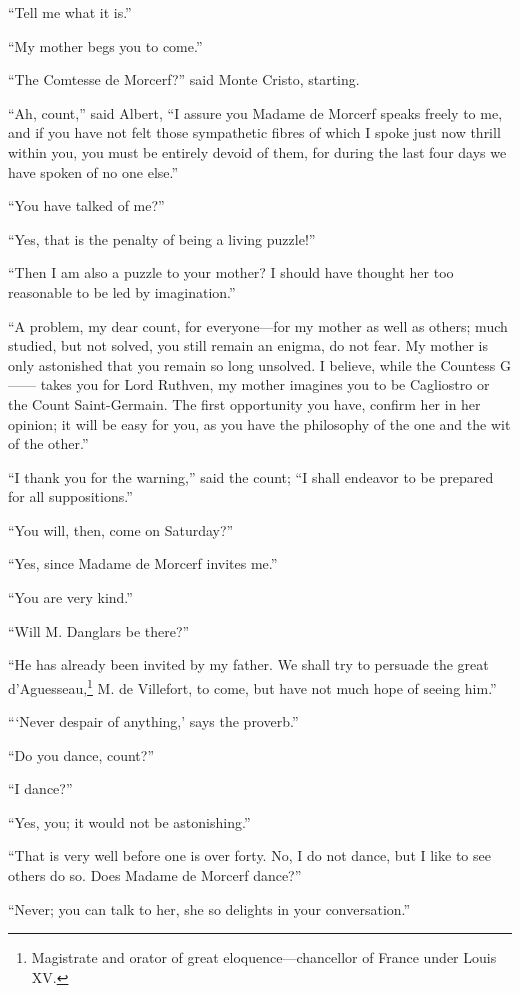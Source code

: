 “Tell me what it is.”

“My mother begs you to come.”

“The Comtesse de Morcerf?” said Monte Cristo, starting.

“Ah, count,” said Albert, “I assure you Madame de Morcerf speaks freely
to me, and if you have not felt those sympathetic fibres of which I
spoke just now thrill within you, you must be entirely devoid of them,
for during the last four days we have spoken of no one else.”

“You have talked of me?”

“Yes, that is the penalty of being a living puzzle!”

“Then I am also a puzzle to your mother? I should have thought her too
reasonable to be led by imagination.”

“A problem, my dear count, for everyone—for my mother as well as
others; much studied, but not solved, you still remain an enigma, do
not fear. My mother is only astonished that you remain so long
unsolved. I believe, while the Countess G—— takes you for Lord Ruthven,
my mother imagines you to be Cagliostro or the Count Saint-Germain. The
first opportunity you have, confirm her in her opinion; it will be easy
for you, as you have the philosophy of the one and the wit of the
other.”

“I thank you for the warning,” said the count; “I shall endeavor to be
prepared for all suppositions.”

“You will, then, come on Saturday?”

“Yes, since Madame de Morcerf invites me.”

“You are very kind.”

“Will M. Danglars be there?”

“He has already been invited by my father. We shall try to persuade the
great d’Aguesseau,\footnote[11]{Magistrate and orator of great
eloquence—chancellor of France under Louis XV.} M. de Villefort, to come,
but have not much hope of seeing him.”

“‘Never despair of anything,’ says the proverb.”

“Do you dance, count?”

“I dance?”

“Yes, you; it would not be astonishing.”

“That is very well before one is over forty. No, I do not dance, but I
like to see others do so. Does Madame de Morcerf dance?”

“Never; you can talk to her, she so delights in your conversation.”

